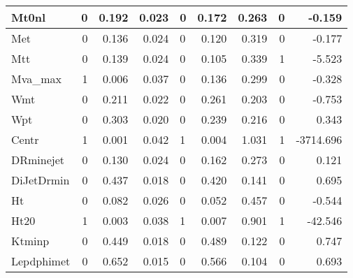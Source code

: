 \begin{table}[htbp]
\begin{center}
\begin{tabular}{|l|r|r|r|l|r|r|r|r|}
\textsf{Mt0nl} & 0 & 0.192 & 0.023 & 0 & 0.172 & 0.263 & 0 & -0.159 \\ \hline
\textsf{Met} & 0 & 0.136 & 0.024 & 0 & 0.120 & 0.319 & 0 & -0.177 \\ \hline
\textsf{Mtt} & 0 & 0.139 & 0.024 & 0 & 0.105 & 0.339 & 1 & -5.523 \\ \hline
\textsf{Mva\_max} & 1 & 0.006 & 0.037 & 0 & 0.136 & 0.299 & 0 & -0.328 \\ \hline
\textsf{Wmt} & 0 & 0.211 & 0.022 & 0 & 0.261 & 0.203 & 0 & -0.753 \\ \hline
\textsf{Wpt} & 0 & 0.303 & 0.020 & 0 & 0.239 & 0.216 & 0 & 0.343 \\ \hline
\textsf{Centr} & 1 & 0.001 & 0.042 & 1 & 0.004 & 1.031 & 1 & -3714.696 \\ \hline
\textsf{DRminejet} & 0 & 0.130 & 0.024 & 0 & 0.162 & 0.273 & 0 & 0.121 \\ \hline
\textsf{DiJetDrmin} & 0 & 0.437 & 0.018 & 0 & 0.420 & 0.141 & 0 & 0.695 \\ \hline
\textsf{Ht} & 0 & 0.082 & 0.026 & 0 & 0.052 & 0.457 & 0 & -0.544 \\ \hline
\textsf{Ht20} & 1 & 0.003 & 0.038 & 1 & 0.007 & 0.901 & 1 & -42.546 \\ \hline
\textsf{Ktminp} & 0 & 0.449 & 0.018 & 0 & 0.489 & 0.122 & 0 & 0.747 \\ \hline
\textsf{Lepdphimet} & 0 & 0.652 & 0.015 & 0 & 0.566 & 0.104 & 0 & 0.693 \\ \hline
\end{tabular}
\end{center}
\label{tab:m4j-tests}
\end{table}
